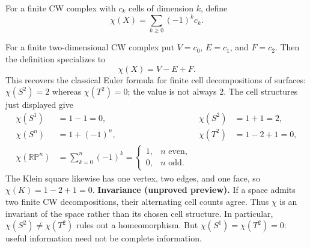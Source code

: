 \begin{definition}
For a finite CW complex with $c_k$ cells of dimension $k$, define
\[
\chi(X)=\sum_{k\geq0}(-1)^k c_k.
\]
\end{definition}
For a finite two-dimensional CW complex put $V=c_0$, $E=c_1$, and
$F=c_2$. Then the definition specializes to
\[
\boxed{\chi(X)=V-E+F.}
\]
This recovers the classical Euler formula for finite cell decompositions
of surfaces: $\chi(S^2)=2$ whereas $\chi(T^2)=0$; the value is not always $2$.
The cell structures just displayed give
\[
\begin{aligned}
\chi(S^1)&=1-1=0,&\chi(S^2)&=1+1=2,\\
\chi(S^n)&=1+(-1)^n,&\chi(T^2)&=1-2+1=0,\\
\chi(\mathbb{RP}^n)&=\sum_{k=0}^n(-1)^k
=\begin{cases}1,&n\text{ even},\\0,&n\text{ odd}.\end{cases}
\end{aligned}
\]
The Klein square likewise has one vertex, two edges, and one face, so
$\chi(K)=1-2+1=0$.
\textbf{Invariance (unproved preview).} If a space admits two finite CW
decompositions, their alternating cell counts agree. Thus $\chi$ is an
invariant of the space rather than its chosen cell structure. In particular,
$\chi(S^2)\ne\chi(T^2)$ rules out a homeomorphism. But
$\chi(S^1)=\chi(T^2)=0$: useful information need not be complete information.

